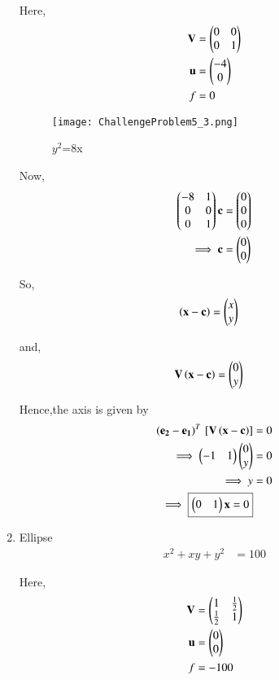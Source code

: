 \documentclass[journal,12pt,twocolumn]{IEEEtran}
\begin{document}
\begin{enumerate}
    Here,
    \begin{align}
    \mathbf{V} &= \begin{pmatrix}0 & 0 \\ 0 & 1\end{pmatrix} \\
    \mathbf{u} &= \begin{pmatrix}-4 \\ 0\end{pmatrix} \\
    f &= 0
    \end{align}

    \begin{figure}[!ht]
    \centering
    \texttt{[image: ChallengeProblem5\_3.png]}
    \caption{$y^2$=8x}
    \label{ex3}	
    \end{figure}

    Now,
    \begin{align}
    \begin{pmatrix}-8 & 1 \\ 0 & 0 \\ 0 & 1\end{pmatrix}\mathbf{c} &= \begin{pmatrix}0 \\ 0 \\ 0\end{pmatrix}
    \\
    \implies \mathbf{c} &= \begin{pmatrix}0 \\ 0\end{pmatrix}
    \end{align}

    So,
    \begin{align}
    \left(\mathbf{x}-\mathbf{c}\right) &= \begin{pmatrix}x \\ y\end{pmatrix}
    \end{align}

    and,
    \begin{align}
    \mathbf{V}\left(\mathbf{x}-\mathbf{c}\right) &= \begin{pmatrix}0 \\ y\end{pmatrix}
    \end{align}

    Hence,the axis is given by
    \begin{align}
    \left(\mathbf{e_2}-\mathbf{e_1}\right)^T{}\left[\mathbf{V}\left(\mathbf{x}-\mathbf{c}\right)\right] &= 0\\
    \implies \begin{pmatrix}-1 & 1\end{pmatrix}\begin{pmatrix}0 \\ y\end{pmatrix} &= 0 \\
    \implies y &= 0  \\
    \implies \boxed{\begin{pmatrix}0 & 1\end{pmatrix}\mathbf{x} = 0}
    \end{align}
    
    \item Ellipse
    \begin{align}
        x^2+xy+y^2 &= 100
    \end{align}
    
    Here,
    \begin{align}
    \mathbf{V} &= \begin{pmatrix}1 & \frac{1}{2} \\ \frac{1}{2} & 1\end{pmatrix} \\
    \mathbf{u} &= \begin{pmatrix}0 \\ 0\end{pmatrix} \\
    f &= -100
    \end{align}


\end{enumerate}
\end{document}

